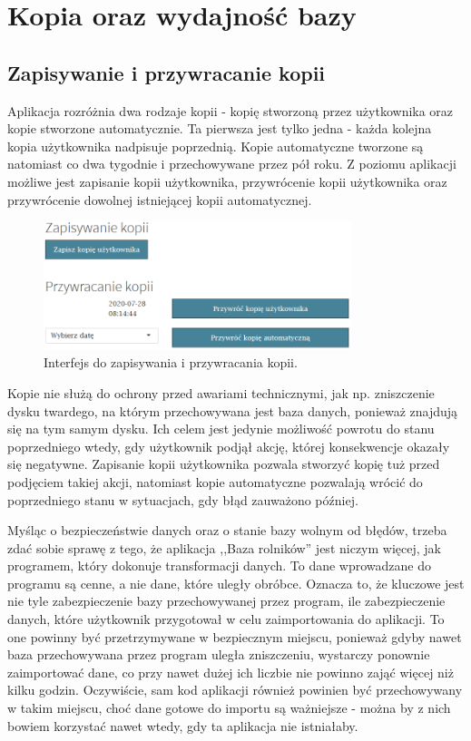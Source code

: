\documentclass[12pt, twoside, hidelinks]{report}
\begin{document}
\chapter{Kopia oraz wydajność bazy}
\thispagestyle{empty}
\pagebreak
\section{Zapisywanie i przywracanie kopii}
Aplikacja rozróżnia dwa rodzaje kopii - kopię stworzoną przez użytkownika oraz kopie stworzone automatycznie. Ta pierwsza jest tylko jedna - każda kolejna kopia użytkownika nadpisuje poprzednią. Kopie automatyczne tworzone są natomiast co dwa tygodnie i przechowywane przez pół roku. Z poziomu aplikacji możliwe jest zapisanie kopii użytkownika, przywrócenie kopii użytkownika oraz przywrócenie dowolnej istniejącej kopii automatycznej. \par
 \begin{figure}[h!]
\includegraphics[width = 0.8\textwidth]{4.1.}
\centering
\caption{Interfejs do zapisywania i przywracania kopii.}
\label{zapisywanie_przywracanie_kopii_interfejs}
\end{figure}
Kopie nie służą do ochrony przed awariami technicznymi, jak np. zniszczenie dysku twardego, na którym przechowywana jest baza danych, ponieważ znajdują się na tym samym dysku. Ich celem jest jedynie możliwość powrotu do stanu poprzedniego wtedy, gdy użytkownik podjął akcję, której konsekwencje okazały się negatywne. Zapisanie kopii użytkownika pozwala stworzyć kopię tuż przed podjęciem takiej akcji, natomiast kopie automatyczne pozwalają wrócić do poprzedniego stanu w sytuacjach, gdy błąd zauważono później. \par
Myśląc o bezpieczeństwie danych oraz o stanie bazy wolnym od błędów, trzeba zdać sobie sprawę z tego, że aplikacja ,,Baza rolników'' jest niczym więcej, jak programem, który dokonuje transformacji danych. To dane wprowadzane do programu są cenne, a nie dane, które uległy obróbce. Oznacza to, że kluczowe jest nie tyle zabezpieczenie bazy przechowywanej przez program, ile zabezpieczenie danych, które użytkownik przygotował w celu zaimportowania do aplikacji. To one powinny być przetrzymywane w bezpiecznym miejscu, ponieważ gdyby nawet baza przechowywana przez program uległa zniszczeniu, wystarczy ponownie zaimportować dane, co przy nawet dużej ich liczbie nie powinno zająć więcej niż kilku godzin. Oczywiście, sam kod aplikacji również powinien być przechowywany w takim miejscu, choć dane gotowe do importu są ważniejsze - można by z nich bowiem korzystać nawet wtedy, gdy ta aplikacja nie istniałaby. \par
\end{document}
